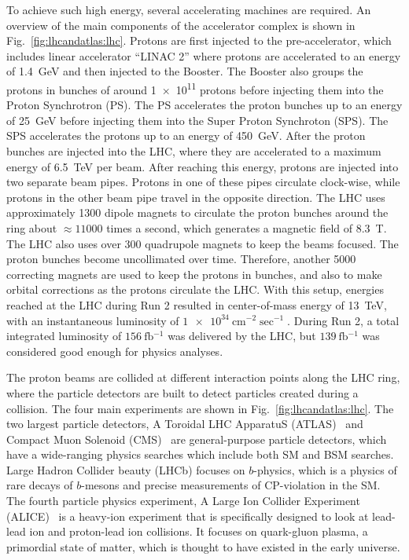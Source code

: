 To achieve such high energy, several accelerating machines are required. An overview of the main components of the accelerator complex is shown in Fig.\ \ref{fig:lhcandatlas:lhc}. Protons are first injected to the pre-accelerator, which includes linear accelerator \enquote{LINAC 2} where protons are accelerated to an energy of \SI{1.4}{\giga\electronvolt} and then injected to the Booster. The Booster also groups the protons in bunches of around \num{1e11} protons before injecting them into the Proton Synchrotron (PS). The PS accelerates the proton bunches up to an energy of \SI{25}{\giga\electronvolt} before injecting them into the Super Proton Synchroton (SPS). The SPS accelerates the protons up to an energy of \SI{450}{\giga\electronvolt}. After the proton bunches are injected into the LHC, where they are accelerated to a maximum energy of \SI{6.5}{\tera\electronvolt} per beam. After reaching this energy, protons are injected into two separate beam pipes. Protons in one of these pipes circulate clock-wise, while protons in the other beam pipe travel in the opposite direction. The LHC uses approximately \num{1300} dipole magnets to circulate the proton bunches around the ring about $\approx\num{11000}$ times a second, which generates a magnetic field of \SI{8.3}{\tesla}. The LHC also uses over \num{300} quadrupole magnets to keep the beams focused. The proton bunches become uncollimated over time. Therefore, another \num{5000} correcting magnets are used to keep the protons in bunches, and also to make orbital corrections as the protons circulate the LHC. With this setup, energies reached at the LHC during Run 2 resulted in center-of-mass energy of \SI{13}{\tera\electronvolt}, with an instantaneous luminosity of $\SI{1e34}{\centi\metre^{-2}\sec^{-1}}$. During Run 2, a total integrated luminosity of $\SI{156}{\femto\barn^{-1}}$ was delivered by the LHC, but $\SI{139}{\femto\barn^{-1}}$ was considered good enough for physics analyses.~\cite{lhc}~\cite{thesis:fletcher}

The proton beams are collided at different interaction points along the LHC ring, where the particle detectors are built to detect particles created during a collision. The four main experiments are shown in Fig.\ \ref{fig:lhcandatlas:lhc}. The two largest particle detectors, A Toroidal LHC ApparatuS (ATLAS)~\cite{atlas} and Compact Muon Solenoid (CMS)~\cite{cms} are general-purpose particle detectors, which have a wide-ranging physics searches which include both SM and BSM searches. Large Hadron Collider beauty (LHCb)\cite{lhcb} focuses on $b$-physics, which is a physics of rare decays of $b$-mesons and precise measurements of CP-violation in the SM. The fourth particle physics experiment, A Large Ion Collider Experiment (ALICE)~\cite{alice} is a heavy-ion experiment that is specifically designed to look at lead-lead ion and proton-lead ion collisions. It focuses on quark-gluon plasma, a primordial state of matter, which is thought to have existed in the early universe.


